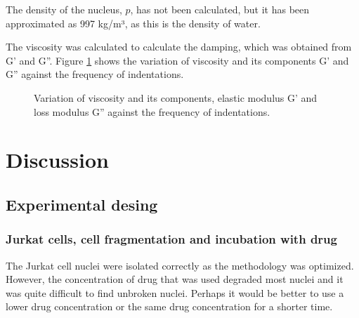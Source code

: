 \documentclass[12pt, a4paper]{article} %
\begin{document}
\setlength{\parskip}{4mm}

The density of the nucleus, $p$, has not been calculated, but it has been approximated as 997 kg/m³, as this is the density of water.

The viscosity was calculated to calculate the damping, which was obtained from G' and G''. Figure \ref{fig:vicosidad} shows the variation of viscosity and its components G' and G'' against the frequency of indentations.

\begin{figure}[H]
	\centering
	
	\caption{Variation of viscosity and its components, elastic modulus G' and loss modulus G'' against the frequency of indentations.}
	\label{fig:vicosidad}
\end{figure}

\newpage

\setlength{\parskip}{0mm}


\section{Discussion}

\subsection{Experimental desing}

\subsubsection{Jurkat cells, cell fragmentation and incubation with drug}

The Jurkat cell nuclei were isolated correctly as the methodology was optimized. However, the concentration of drug that was used degraded most nuclei and it was quite difficult to find unbroken nuclei. Perhaps it would be better to use a lower drug concentration or the same drug concentration for a shorter time. 
\end{document}
